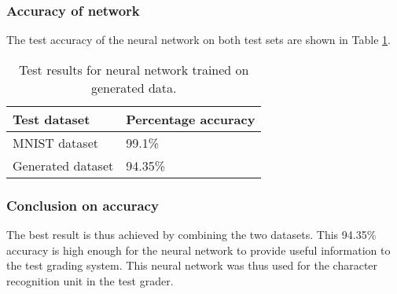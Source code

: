 \subsubsection{Accuracy of network}
The test accuracy of the neural network on both test sets are shown in Table \ref{tbl:nnResult3}.

\begin{table}
\caption{Test results for neural network trained on generated data.} \label{tbl:nnResult3}
  \centering
\begin{tabular}{|p{4cm}|p{5cm}|}
\hline
\textbf{Test dataset}&\textbf{Percentage accuracy}\\
\hline
MNIST dataset&99.1\%\\
\hline
Generated dataset&94.35\%\\
\hline
\end{tabular}
\end{table}

\subsubsection{Conclusion on accuracy}
The best result is thus achieved by combining the two datasets. This 94.35\% accuracy is high enough for the neural network to provide useful information to the test grading system. This neural network was thus used for the character recognition unit in the test grader.
